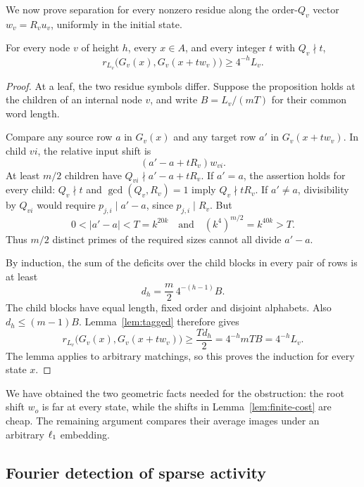 We now prove separation for every nonzero residue along the
order-$Q_v$ vector $w_v=R_vu_v$, uniformly in the initial state.

\begin{proposition}\label{prop:finite-separation}
For every node $v$ of height $h$, every $x\in A$, and every integer
$t$ with $Q_v\nmid t$,
\begin{equation}\label{eq:finite-separation}
 r_{L_v}\bigl(G_v(x),G_v(x+t w_v)\bigr)\geq4^{-h}L_v.
\end{equation}
\end{proposition}
\begin{proof}
At a leaf, the two residue symbols differ. Suppose the proposition
holds at the children of an internal node $v$, and write
$B=L_v/(mT)$ for their common word length.

Compare any source row $a$ in $G_v(x)$ and any target row $a'$ in
$G_v(x+t w_v)$. In child $vi$, the relative input shift is
\[
 (a'-a+tR_v)w_{vi}.
\]
At least $m/2$ children have $Q_{vi}\nmid a'-a+tR_v$. If $a'=a$,
the assertion holds for every child: $Q_v\nmid t$ and
$\gcd(Q_v,R_v)=1$ imply $Q_v\nmid tR_v$. If $a'\ne a$, divisibility
by $Q_{vi}$ would require $p_{j,i}\mid a'-a$, since
$p_{j,i}\mid R_v$. But
\[
 0<|a'-a|<T=k^{20k}
 \quad\text{and}\quad
 (k^4)^{m/2}=k^{40k}>T.
\]
Thus $m/2$ distinct primes of the required sizes cannot all divide
$a'-a$.

By induction, the sum of the deficits over the child blocks in every
pair of rows is at least
\begin{equation}\label{eq:finite-charge}
 d_h=\frac m2\,4^{-(h-1)}B.
\end{equation}
The child blocks have equal length, fixed order and disjoint alphabets.
Also $d_h\leq(m-1)B$. Lemma~\ref{lem:tagged} therefore gives
\[
 r_{L_v}\bigl(G_v(x),G_v(x+t w_v)\bigr)
 \geq\frac{Td_h}{2}
 =4^{-h}mTB=4^{-h}L_v.
\]
The lemma applies to arbitrary matchings, so this proves the induction
for every state $x$.
\end{proof}

We have obtained the two geometric facts needed for the obstruction:
the root shift $w_o$ is far at every state, while the shifts in
Lemma~\ref{lem:finite-cost} are cheap. The remaining argument compares
their average images under an arbitrary $\ell_1$ embedding.

\subsection{Fourier detection of sparse activity}

